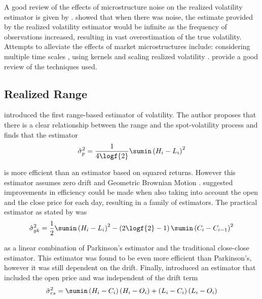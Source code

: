 \documentclass[12pt]{article}
\begin{document}
A good review of the effects of microstructure noise on the realized volatility estimator is given by
\citet{McAleer2008}. \citet{Bandi2008} showed that when there was noise, the estimate provided by the realized
volatility estimator would be infinite as the frequency of observations increased, resulting in vast
overestimation of the true
volatility. \\

Attempts to alleviate the effects of market microstructures include: considering multiple time scales
\citep{Zhang2005}, using kernels \citep{Zhou1996,Barndorff-Nielsen2008a} and scaling realized volatility
\citep{Martens2007}. \citet{McAleer2008} provide a good review of the techniques used.

\subsection{Realized Range}
\label{sec:realized-range}
\citet{Parkinson1980} introduced the first range-based estimator of volatility. The author proposes that there
is a clear relationship between the range and the spot-volatility process and finds that the estimator
\begin{align*}
  \hat{\sigma}_{p}^2 = \frac{1}{4 \logf{2}} \sumin \left(H_i - L_i \right)^2
\end{align*}

is more efficient than an estimator based on squared returns. However this estimator assumes zero drift and
Geometric Brownian Motion \citep{Kunitomo1992}. \citet{Garman1980} suggested improvements in efficiency could
be made when also taking into account the open and the close price for each day, resulting in a family of
estimators. The practical estimator as stated by \citet{Haug2007} was
\begin{align*}
  \hat{\sigma}_{gk}^2 = \frac{1}{2} \sumin \left( {H_i} - {L_i} \right)^2 - \left(2 \logf{2} -
    1 \right) \sumin \left( {C_i} - {C_{i-1}} \right)^2
\end{align*}

as a linear combination of Parkinson's estimator and the traditional close-close estimator. This estimator was
found to be even more efficient than Parkinson's, however it was still dependent on the drift. Finally,
\citet{Rogers1991} introduced an estimator that included the open price and was independent of the drift term
\begin{align*}
  \hat{\sigma}_{rs}^2 = \sumin \left( H_i - C_i \right) \left( H_i - O_i \right)
    + \left( L_i - C_i \right) \left( L_i - O_i \right)
\end{align*}
\end{document}
